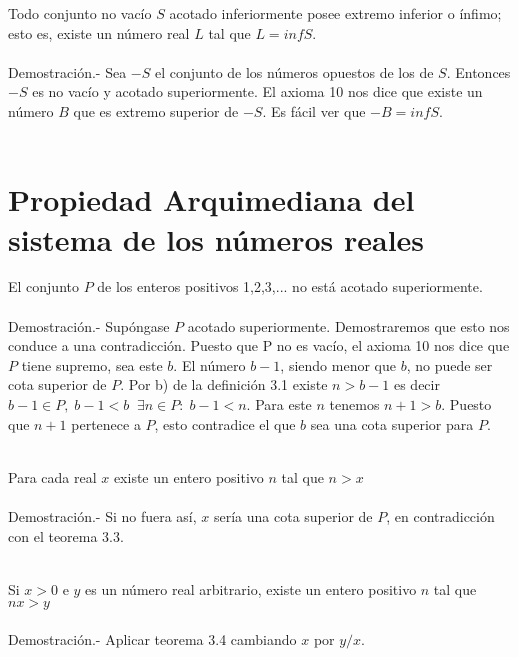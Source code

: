 \begin{teo}
Todo conjunto no vacío $S$ acotado inferiormente posee extremo inferior  o ínfimo; esto es, existe un número real $L$ tal que $L=infS$.\\\\
Demostración.- \; Sea $-S$ el conjunto de los números opuestos de los de $S$. Entonces $-S$ es no vacío y acotado superiormente. El axioma 10 nos dice que existe un número $B$ que es extremo superior de $-S$. Es fácil ver que $-B=infS$.\\\\
\end{teo}

\section*{Propiedad Arquimediana del sistema de los números reales}
\begin{teo}
El conjunto $P$ de los enteros positivos 1,2,3,... no está acotado superiormente.\\\\
Demostración.- \; Supóngase $P$ acotado superiormente. Demostraremos que esto nos conduce a una contradicción. Puesto que P no es vacío, el axioma 10 nos dice que $P$ tiene supremo, sea este $b$. El número $b-1$, siendo menor que $b$, no puede ser cota superior de $P$. Por b) de la definición 3.1 existe $n>b-1$ es decir $b-1 \in P, \; b-1<b \; \; \exists n \in P:\; b-1<n$. Para este $n$ tenemos $n+1>b$. Puesto que $n+1$ pertenece a $P$, esto contradice el que $b$ sea una cota superior para $P$. \\\\
\end{teo}

\begin{teo}
Para cada real $x$ existe un entero positivo $n$ tal que $n>x$\\\\
Demostración.- \; Si no fuera así, $x$ sería una cota superior de $P$, en contradicción con el teorema 3.3.\\\\
\end{teo}

\begin{teo}
Si $x>0$ e $y$ es un número real arbitrario, existe un entero positivo $n$ tal que $nx>y$\\\\
Demostración.- \; Aplicar teorema 3.4 cambiando $x$ por $y/x$.\\\\
\end{teo}

